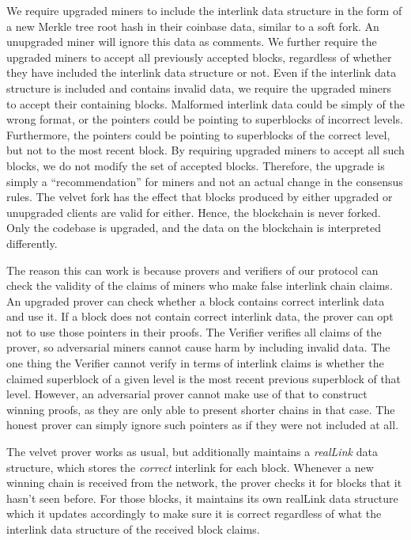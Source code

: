 We require upgraded miners to include the interlink data structure in the form
of a new Merkle tree root hash in their coinbase data, similar to a soft fork.
An unupgraded miner will ignore this data as comments. We further require the
upgraded miners to accept all previously accepted blocks, regardless of whether
they have included the interlink data structure or not. Even if the interlink
data structure is included and contains invalid data, we require the upgraded
miners to accept their containing blocks. Malformed interlink data could be
simply of the wrong format, or the pointers could be pointing to superblocks of
incorrect levels. Furthermore, the pointers could be pointing to superblocks of
the correct level, but not to the most recent block. By requiring upgraded
miners to accept all such blocks, we do not modify the set of accepted blocks.
Therefore, the upgrade is simply a ``recommendation'' for miners and not an
actual change in the consensus rules. The velvet fork has the effect that blocks
produced by either upgraded or unupgraded clients are valid for either. Hence,
the blockchain is never forked. Only the codebase is upgraded, and the  data on
the blockchain is interpreted differently.

The reason this can work is because provers and verifiers of our protocol can
check the validity of the claims of miners who make false interlink chain
claims. An upgraded prover can check whether a block contains correct interlink
data and use it. If a block does not contain correct interlink data, the prover
can opt not to use those pointers in their proofs. The Verifier verifies all
claims of the prover, so adversarial miners cannot cause harm by including
invalid data. The one thing the Verifier cannot verify in terms of interlink
claims is whether the claimed superblock of a given level is the most recent
previous superblock of that level. However, an adversarial prover cannot make
use of that to construct winning proofs, as they are only able to present
shorter chains in that case.
The
honest prover can simply ignore such pointers as if they were not included at
all.

The velvet prover works as usual, but additionally maintains a \textit{realLink}
data structure, which stores the \textit{correct} interlink for each block.
Whenever a new winning chain is received from the network, the prover checks it
for blocks that it hasn't seen before. For those blocks, it maintains its own
realLink data structure which it updates accordingly to make sure it is correct
regardless of what the interlink data structure of the received block claims.

